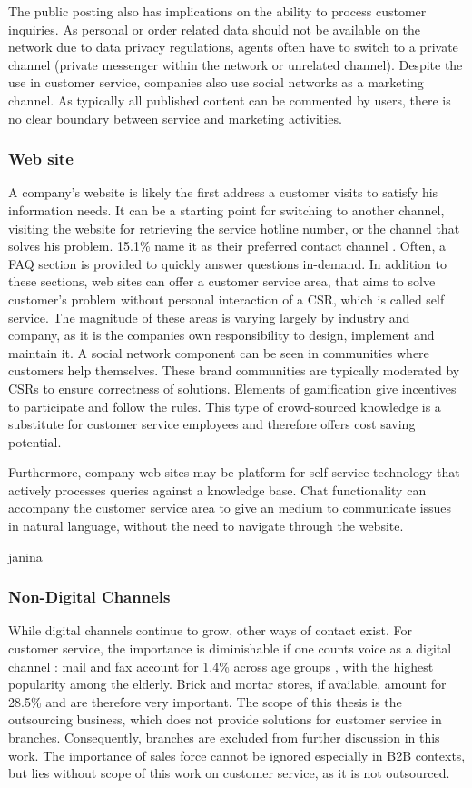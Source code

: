 		The public posting also has implications on the ability to process customer inquiries. As personal or order related data should not be available on the network due to data privacy regulations, agents often have to switch to a private channel (\ie private messenger within the network or unrelated channel). Despite the use in customer service, companies also use social networks as a marketing channel. As typically all published content can be commented by users, there is no clear boundary between service and marketing activities. 
		
		
		\subsubsection{Web site}
		
		A company's website is likely the first address a customer visits to satisfy his information needs. It can be a starting point for switching to another channel, \ie visiting the website for retrieving the service hotline number, or the channel that solves his problem. 15.1\% name it as their preferred contact channel \cite{Agnischock2015}. Often, a \acrfull{FAQ} section is provided to quickly answer questions in-demand. In addition to these sections, web sites can offer a customer service area, that aims to solve customer's problem without personal interaction of a \acrshort{CSR}, which is called self service. The magnitude of these areas is varying largely by industry and company, as it is the companies own responsibility to design, implement and maintain it. A social network component can be seen in communities where customers help themselves. These brand communities \cite{Hsieh_2017} are typically moderated by \acrshort{CSR}s to ensure correctness of solutions. Elements of gamification give incentives to participate and follow the rules. This type of crowd-sourced knowledge is a substitute for customer service employees and therefore offers cost saving potential. 
		
		Furthermore, company web sites may be platform for self service technology that actively processes queries against a knowledge base. Chat functionality can accompany the customer service area to give an medium to communicate issues in natural language, without the need to navigate through the website. 
	
		
		janina
		\subsubsection{Non-Digital Channels}
		While digital channels continue to grow, other ways of contact exist. For customer service, the importance is diminishable if one counts voice as a digital channel : mail and fax account for 1.4\% across age groups \cite{Agnischock2015}, with the highest popularity among the elderly. Brick and mortar stores, if available, amount for 28.5\% and are therefore very important. The scope of this thesis is the outsourcing business, which does not provide solutions for customer service in branches. Consequently, branches are excluded from further discussion in this work. The importance of sales force cannot be ignored especially in B2B contexts, but lies without scope of this work on customer service, as it is not outsourced. 
		
